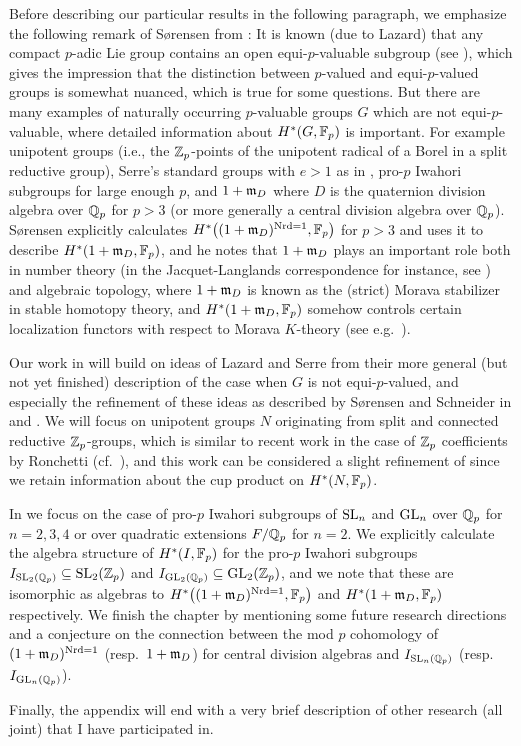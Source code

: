 Before describing our particular results in the following paragraph, we emphasize the following remark of Sørensen from \cite{Sor}: It is known (due to Lazard) that any compact $p$-adic Lie group contains an open equi-$p$-valuable subgroup (see \cite[Chap.~V~2.2.7.1]{Laz}), which gives the impression that the distinction between $p$-valued and equi-$p$-valued groups is somewhat nuanced, which is true for some questions. But there are many examples of naturally occurring $p$-valuable groups $G$ which are not equi-$p$-valuable, where detailed information about $H^{*}(G,\mathbb{F}_{p})$ is important. For example unipotent groups (i.e., the $\mathbb{Z}_{p}$-points of the unipotent radical of a Borel in a split reductive group), Serre's standard groups with $e>1$ as in \cite[Lem.~2.2.2]{Laz-complements}, pro-$p$ Iwahori subgroups for large enough $p$, and $1 + \mathfrak{m}_{D}$ where $D$ is the quaternion division algebra over $\mathbb{Q}_{p}$ for $p > 3$ (or more generally a central division algebra over $\mathbb{Q}_{p}$). Sørensen explicitly calculates $H^{*}\bigl( (1+\mathfrak{m}_{D})^{\operatorname{Nrd} = 1} , \mathbb{F}_{p} \bigr)$ for $p>3$ and uses it to describe $H^{*}(1+\mathfrak{m}_{D},\mathbb{F}_{p})$, and he notes that $1+\mathfrak{m}_{D}$ plays an important role both in number theory (in the Jacquet-Langlands correspondence for instance, see \cite{JL}) and algebraic topology, where $1+\mathfrak{m}_{D}$ is known as the (strict) Morava stabilizer in stable homotopy theory, and $H^{*}(1+\mathfrak{m}_{D},\mathbb{F}_{p})$ somehow controls certain localization functors with respect to Morava $K$-theory (see e.g.\ \cite{Henn}).

Our work in  will build on ideas of Lazard and Serre from their more general (but not yet finished) description of the case when $G$ is not equi-$p$-valued, and especially the refinement of these ideas as described by Sørensen and Schneider in \cite{Sor} and \cite{Sch-notes}. We will focus on unipotent groups $N$ originating from split and connected reductive $\mathbb{Z}_p$-groups, which is similar to recent work in the case of $\mathbb{Z}_p$ coefficients by Ronchetti (cf.\ \cite{Ron}), and this work can be considered a slight refinement of \cite{GK} since we retain information about the cup product on $H^{*}(N,\mathbb{F}_{p})$.

In  we focus on the case of pro-$p$ Iwahori subgroups of $\operatorname{SL}_{n}$ and $\operatorname{GL}_{n}$ over $\mathbb{Q}_{p}$ for $n=2,3,4$ or over quadratic extensions $F/\mathbb{Q}_{p}$ for $n=2$. We explicitly calculate the algebra structure of $H^{*}(I,\mathbb{F}_{p})$ for the pro-$p$ Iwahori subgroups $I_{\operatorname{SL}_{2}(\mathbb{Q}_{p})} \subseteq \operatorname{SL}_{2}(\mathbb{Z}_{p})$ and $I_{\operatorname{GL}_{2}(\mathbb{Q}_{p})} \subseteq \operatorname{GL}_{2}(\mathbb{Z}_{p})$, and we note that these are isomorphic as algebras to $H^{*}\bigl( (1+\mathfrak{m}_{D})^{\operatorname{Nrd} = 1},\mathbb{F}_{p} \bigr)$ and $H^{*}(1+\mathfrak{m}_{D},\mathbb{F}_{p})$ respectively. We finish the chapter by mentioning some future research directions and a conjecture on the connection between the mod $p$ cohomology of $(1+\mathfrak{m}_{D})^{\operatorname{Nrd} = 1}$ (resp.\ $1+\mathfrak{m}_{D}$) for central division algebras and $I_{\operatorname{SL}_{n}(\mathbb{Q}_{p})}$ (resp.\ $I_{\operatorname{GL}_{n}(\mathbb{Q}_{p})}$).

Finally, the appendix will end with a very brief description of other research (all joint) that I have participated in.


